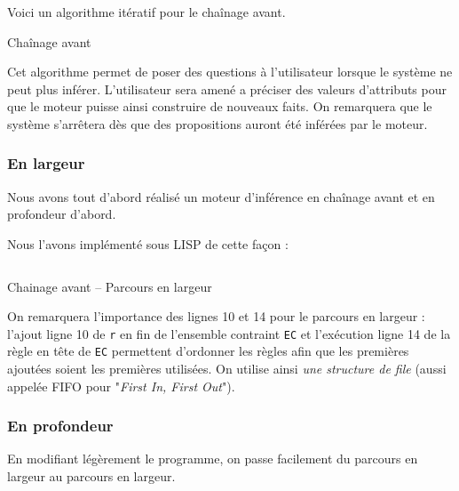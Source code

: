 \documentclass[a4paper,12pt]{article}
\begin{document}
Voici un algorithme itératif pour le chaînage avant.
\begin{algorithm}

\caption{Chaînage avant \label{algoChainageAvant}}
\end{algorithm}

Cet algorithme permet de poser des questions à l'utilisateur lorsque le système ne peut plus inférer. L'utilisateur sera amené a préciser des valeurs d'attributs pour que le moteur puisse ainsi construire de nouveaux faits. On remarquera que le système s'arrêtera dès que des propositions auront été inférées par le moteur.

\subsubsection{En largeur}

	Nous avons tout d'abord réalisé un moteur d'inférence en chaînage avant et en profondeur d'abord.

Nous l'avons implémenté sous LISP de cette façon :

\begin{listing}[H]
	\centering
	\inputminted[breaklines=true,linenos]{lisp}{../chainageAvantLarg.lisp}
	\caption{Chainage avant -- Parcours en largeur}
\end{listing}

On remarquera l'importance des lignes 10 et 14 pour le parcours en largeur : l'ajout ligne 10 de \texttt{r} en fin de l'ensemble contraint \texttt{EC} et l'exécution ligne 14 de la règle en tête de \texttt{EC} permettent d'ordonner les règles afin que les premières ajoutées soient les premières utilisées. On utilise ainsi \textit{une structure de file} (aussi appelée FIFO pour "\textit{First In, First Out}").

\subsubsection{En profondeur}

En modifiant légèrement le programme, on passe facilement du parcours en largeur au parcours en largeur.
\end{document}
